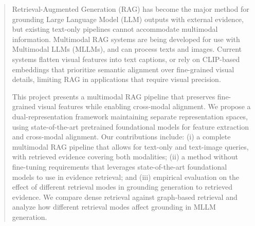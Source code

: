 \begin{abstract}
\normalsize
Retrieval-Augmented Generation (RAG) has become the major method for grounding Large Language Model (LLM) outputs with external evidence,
but existing text-only pipelines cannot accommodate multimodal information.
Multimodal RAG systems are being developed for use with Multimodal LLMs (MLLMs), and can process texts and images.
Current systems flatten visual features into text captions, or rely on CLIP-based embeddings that prioritize semantic alignment
over fine-grained visual details, limiting RAG in applications that require visual precision.

This project presents a multimodal RAG pipeline that preserves fine-grained visual features while enabling cross-modal alignment.
We propose a dual-representation framework maintaining separate representation spaces, 
using state-of-the-art pretrained foundational models for feature extraction and cross-modal alignment.
Our contributions include:
(i) a complete multimodal RAG pipeline that allows for text-only and text-image queries, with retrieved evidence covering both modalities;
(ii) a method without fine-tuning requirements that leverages state-of-the-art foundational models to use in evidence retrieval;
and (iii) empirical evaluation on the effect of different retrieval modes in grounding generation to retrieved evidence.
We compare dense retrieval against graph-based retrieval and analyze how different retrieval modes affect grounding in MLLM generation.
\end{abstract}